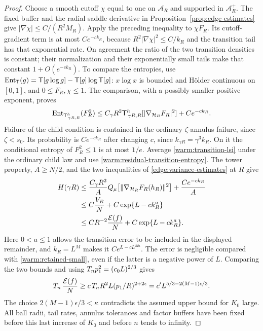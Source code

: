 \begin{proof}
Choose a smooth cutoff \(\chi\) equal to one on \(\mathcal A_R\)
and supported in \(\mathcal A_R^+\).  The fixed buffer and the
radial saddle derivative in Proposition~\ref{prop:edge-estimates} give
\(|\nabla\chi|\le C/(R^2M_R)\).  Apply the preceding inequality to
\(\chi F_R\).  Its cutoff-gradient term is at most \(Ce^{-c k_R}\),
because \(R^2|\nabla\chi|^2\le C/k_R\) and the transition tail has
that exponential rate.  On agreement the ratio of the two transition
densities is constant; their normalization and their exponentially small
tails make that constant \(1+O(e^{-c k_R})\).  To compare the entropies,
use
\(\operatorname{Ent}_{\mathsf T}(g)=\mathsf T[g\log g]-\mathsf T[g]\log\mathsf T[g]\):
\(x\log x\) is bounded and H\"older continuous on \([0,1]\), and
\(0\le F_R,\chi\le1\).  The comparison, with a possibly smaller
positive exponent, proves
\begin{equation}
 \operatorname{Ent}_{\mathsf T_{\,\gamma R,R}^{h}}(F_R^2)
 \le C_\gamma R^2\mathsf T_{\,\gamma R,R}^{h}
                   [|\nabla_{\mathcal H_R}F_R|^2]+Ce^{-c k_R}.
                                                               \label{warm:transition-lsi}
\end{equation}
Failure of the child condition is contained in the ordinary
\(\zeta\)-annulus failure, since \(\zeta<s_0\).  Its probability is
\(Ce^{-c k_R}\) after changing \(c\), since
\(k_{\gamma R}=\gamma^3k_R\).
On it the conditional entropy of \(F_R^2\le1\) is at most \(1/e\).
Average \eqref{warm:transition-lsi} under the ordinary child law and
use \eqref{warm:residual-transition-entropy}.  The tower property,
\(A\ge N/2\), and the two inequalities of
\eqref{edge:variance-estimates} at \(R\) give
\begin{equation}
 \begin{split}
 H(\gamma R)
 &\le\frac{C_\gamma R^2}{A}
       Q_\mu\!\left[\|\nabla_{\mathcal H_R}F_R(h_R)\|^2\right]
       +\frac{Ce^{-c k_R}}A\\
 &\le C\frac{V_R}{N}+C\exp\{L-c k_R^a\}\\
 &\le C R^{-2}\frac{\mathcal E(f)}N+C\exp\{L-c k_R^a\}.
 \end{split}                                                \label{warm:small-upper}
\end{equation}
Here \(0<a\le1\) allows the transition error to be included in the
displayed remainder, and \(k_R=L^M\) makes it \(C e^{L-cL^{Ma}}\).
The error is negligible compared with
\eqref{warm:retained-small}, even if the latter is a negative power
of \(L\).  Comparing the two bounds and using
\(T_n p_1^2=(c_0L)^{2/3}\) gives
\[
 T_n\,\frac{\mathcal E(f)}N
 \ge c\,T_n R^2L(p_1/R)^{2+2\epsilon}
 =c' L^{5/3-2(M-1)\epsilon/3}.
\]
The choice \(2(M-1)\epsilon/3<\kappa\) contradicts the assumed upper
bound for \(K_0\) large.  All ball radii, tail rates, annulus
tolerances and factor buffers have been fixed before this last
increase of \(K_0\) and before \(n\) tends to infinity.
\end{proof}

